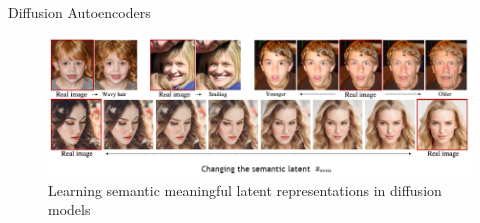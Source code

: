 \begin{frame}{Diffusion Autoencoders}

\begin{figure}
    \centering
    \includegraphics[height=0.8\textheight, width=\textwidth, keepaspectratio]{images/diffusion/diff_results_10.png}
    \caption*{Learning semantic meaningful latent representations in diffusion models}
\end{figure}

\end{frame}